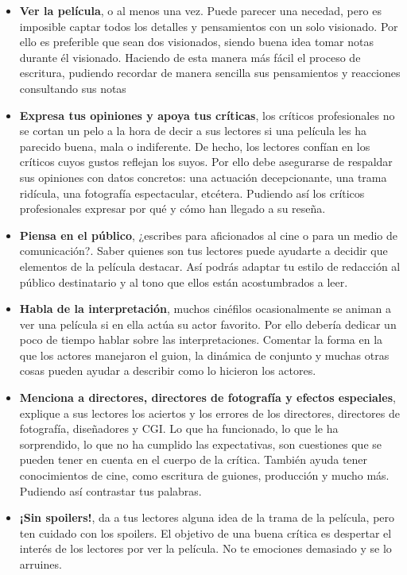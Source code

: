 \begin{itemize}
\item \textbf{Ver la película}, o al menos una vez. Puede parecer una necedad, pero es imposible captar todos los detalles y pensamientos con un solo visionado. Por ello es preferible que sean dos visionados, siendo buena idea tomar notas durante él visionado. Haciendo de esta manera más fácil el proceso de escritura, pudiendo recordar de manera sencilla sus pensamientos y reacciones consultando sus notas 
\item \textbf{Expresa tus opiniones y apoya tus críticas}, los críticos profesionales no se cortan un pelo a la hora de decir a sus lectores si una película les ha parecido buena, mala o indiferente. De hecho, los lectores confían en los críticos cuyos gustos reflejan los suyos. Por ello debe asegurarse de respaldar sus opiniones con datos concretos: una actuación decepcionante, una trama ridícula, una fotografía espectacular, etcétera. Pudiendo así los críticos profesionales expresar por qué y cómo han llegado a su reseña.
\item \textbf{Piensa en el público}, ¿escribes para aficionados al cine o para un medio de comunicación?. Saber quienes son tus lectores puede ayudarte a decidir que elementos de la película destacar. Así podrás adaptar tu estilo de redacción al público destinatario y al tono que ellos están acostumbrados a leer.
\item \textbf{Habla de la interpretación}, muchos cinéfilos ocasionalmente se animan a ver una película si en ella actúa su actor favorito. Por ello debería dedicar un poco de tiempo hablar sobre las interpretaciones. Comentar la forma en la que los actores manejaron el guion, la dinámica de conjunto y muchas otras cosas pueden ayudar a describir como lo hicieron los actores.
\item \textbf{Menciona a directores, directores de fotografía y efectos especiales}, explique a sus lectores los aciertos y los errores de los directores, directores de fotografía, diseñadores y CGI. Lo que ha funcionado, lo que le ha sorprendido, lo que no ha cumplido las expectativas, son cuestiones que se pueden tener en cuenta en el cuerpo de la crítica. También ayuda tener conocimientos de cine, como escritura de guiones, producción y mucho más. Pudiendo así contrastar tus palabras.
\item \textbf{¡Sin spoilers!}, da a tus lectores alguna idea de la trama de la película, pero ten cuidado con los spoilers. El objetivo de una buena crítica es despertar el interés de los lectores por ver la película. No te emociones demasiado y se lo arruines.

\end{itemize}
